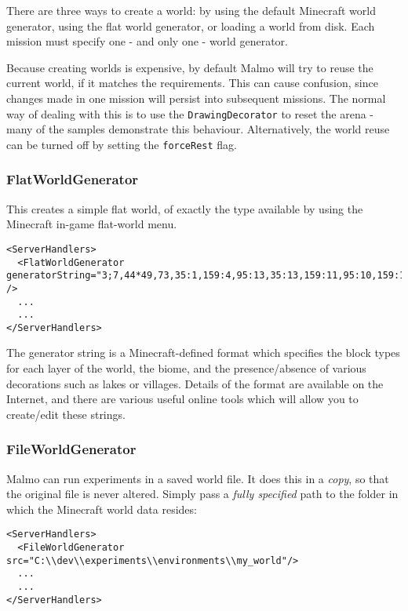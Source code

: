 \documentclass[11pt]{article} %
\begin{document}
There are three ways to create a world: by using the default Minecraft world generator, using the flat world generator, or loading a world from disk. Each mission must specify one - and only one - world generator.

\begin{mdframed}[style=tipFrame]
Because creating worlds is expensive, by default Malmo will try to reuse the current world, if it matches the requirements. This can cause confusion, since changes made in one mission will persist into subsequent missions. The normal way of dealing with this is to use the \lstinline!DrawingDecorator! to reset the arena - many of the samples demonstrate this behaviour. Alternatively, the world reuse can be turned off by setting the \lstinline!forceRest! flag.
\end{mdframed}

\subsubsection{FlatWorldGenerator}
This creates a simple flat world, of exactly the type available by using the Minecraft in-game flat-world menu.

\begin{lstlisting}[frame=lines]
<ServerHandlers>
  <FlatWorldGenerator generatorString="3;7,44*49,73,35:1,159:4,95:13,35:13,159:11,95:10,159:14,159:6,35:6,95:6;157;" />
  ...
  ...
</ServerHandlers>
\end{lstlisting}

The generator string is a Minecraft-defined format which specifies the block types for each layer of the world, the biome, and the presence/absence of various decorations such as lakes or villages. Details of the format are available on the Internet, and there are various useful online tools which will allow you to create/edit these strings.

\subsubsection{FileWorldGenerator}

Malmo can run experiments in a saved world file. It does this in a \emph{copy}, so that the original file is never altered. Simply pass a \emph{fully specified} path to the folder in which the Minecraft world data resides:

\begin{lstlisting}[frame=lines]
<ServerHandlers>
  <FileWorldGenerator src="C:\\dev\\experiments\\environments\\my_world"/>
  ...
  ...
</ServerHandlers>
\end{lstlisting}
\end{document}
